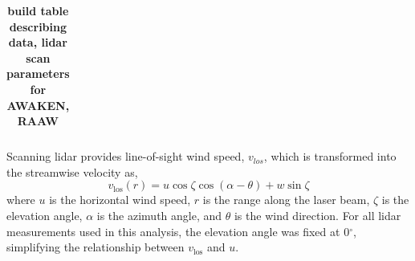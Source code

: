 \documentclass[%
 aip,
 amsmath,
 amssymb,
]{revtex4-2}
\newcommand{\comment}[1]{\textbf{\textcolor{red!50!black}{#1}}}
\begin{document}
\begin{table}[htbp]
  \caption{\comment{build table describing data, lidar scan parameters for AWAKEN, RAAW}}
  \label{tab:data}
  \centering\begin{tabular}{rcc}
  \end{tabular}
\end{table}


Scanning lidar provides line-of-sight wind speed, $v_{los}$, which is transformed into the streamwise velocity as,
\begin{equation}
v_\text{los}(r)=u \cos\zeta \cos(\alpha-\theta)+ w\sin\zeta
\label{los wind speed}
\end{equation}
where $u$ is the horizontal wind speed, $r$ is the range along the laser beam, $\zeta$ is the elevation angle, $\alpha$ is the azimuth angle, and $\theta$ is the wind direction. 
For all lidar measurements used in this analysis, the elevation angle was fixed at 0$^\circ$, simplifying the relationship between $v_\text{los}$ and $u$.
\end{document}

